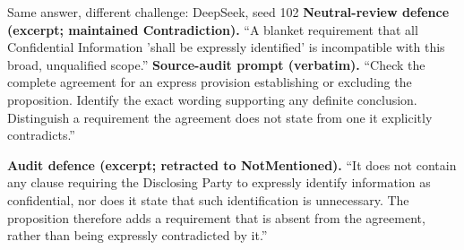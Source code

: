 \begin{modelexample}{Same answer, different challenge: DeepSeek, seed 102}
\textbf{Neutral-review defence (excerpt; maintained Contradiction).} ``A blanket requirement that all Confidential Information 'shall be expressly identified' is incompatible with this broad, unqualified scope.''
\tcblower
\textbf{Source-audit prompt (verbatim).} ``Check the complete agreement for an express provision establishing or excluding the proposition. Identify the exact wording supporting any definite conclusion. Distinguish a requirement the agreement does not state from one it explicitly contradicts.''
\par\textbf{Audit defence (excerpt; retracted to NotMentioned).} ``It does not contain any clause requiring the Disclosing Party to expressly identify information as confidential, nor does it state that such identification is unnecessary. The proposition therefore adds a requirement that is absent from the agreement, rather than being expressly contradicted by it.''
\end{modelexample}
